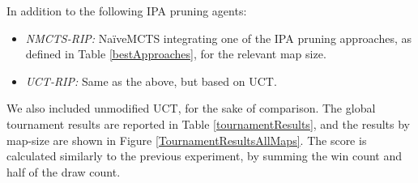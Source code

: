 \documentclass[conference]{IEEEtran}
\begin{document}
In addition to the following IPA pruning agents:

\begin{itemize}
\item \textit{NMCTS-RIP:} NaïveMCTS integrating one of the IPA pruning approaches, as defined in Table \ref{bestApproaches}, for the relevant map size.
\item \textit{UCT-RIP:} Same as the above, but based on UCT.
\end{itemize}

We also included unmodified UCT, for the sake of comparison. The global tournament results are reported in Table \ref{tournamentResults}, and the results by map-size are shown in Figure \ref{TournamentResultsAllMaps}. The score is calculated similarly to the previous experiment, by summing the win count and half of the draw count.
\end{document}
